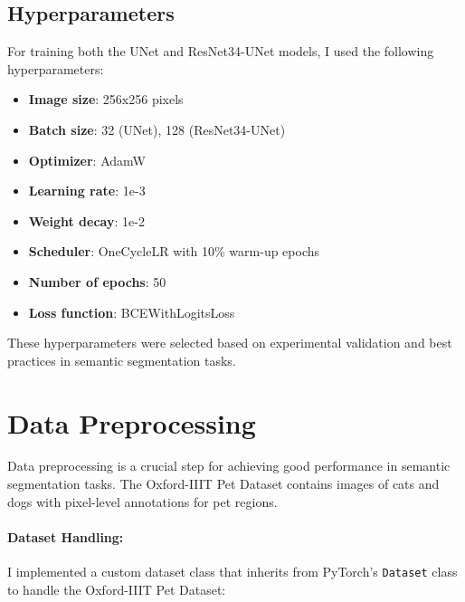 \documentclass[twocolumn,a4paper]{article}
\begin{document}
\subsection{Hyperparameters}
For training both the UNet and ResNet34-UNet models, I used the following hyperparameters:

\begin{itemize}
    \item \textbf{Image size}: 256x256 pixels
    \item \textbf{Batch size}: 32 (UNet), 128 (ResNet34-UNet)
    \item \textbf{Optimizer}: AdamW
    \item \textbf{Learning rate}: 1e-3
    \item \textbf{Weight decay}: 1e-2
    \item \textbf{Scheduler}: OneCycleLR with 10\% warm-up epochs
    \item \textbf{Number of epochs}: 50
    \item \textbf{Loss function}: BCEWithLogitsLoss
\end{itemize}

These hyperparameters were selected based on experimental validation and best practices in semantic segmentation tasks.


\section{Data Preprocessing}

Data preprocessing is a crucial step for achieving good performance in semantic segmentation tasks. The Oxford-IIIT Pet Dataset contains images of cats and dogs with pixel-level annotations for pet regions.

\paragraph{Dataset Handling:}
I implemented a custom dataset class that inherits from PyTorch's \texttt{Dataset} class to handle the Oxford-IIIT Pet Dataset:
\end{document}

